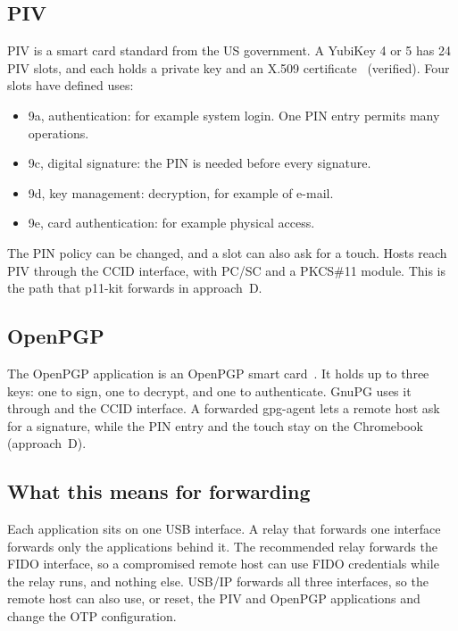 \subsection{PIV}

PIV is a smart card standard from the US government. A YubiKey 4 or 5 has 24
PIV slots, and each holds a private key and an X.509
certificate~\cite{yk-piv} (verified). Four slots have defined uses:
\begin{itemize}
\item 9a, authentication: for example system login. One PIN entry permits
      many operations.
\item 9c, digital signature: the PIN is needed before every signature.
\item 9d, key management: decryption, for example of e-mail.
\item 9e, card authentication: for example physical access.
\end{itemize}
The PIN policy can be changed, and a slot can also ask for a touch. Hosts
reach PIV through the CCID interface, with PC/SC and a PKCS\#11 module. This
is the path that p11-kit forwards in approach~D.

\subsection{OpenPGP}

The OpenPGP application is an OpenPGP smart card~\cite{yk-pgp}. It holds up
to three keys: one to sign, one to decrypt, and one to authenticate. GnuPG
uses it through  and the CCID interface. A forwarded
gpg-agent lets a remote host ask for a signature, while the PIN entry and the
touch stay on the Chromebook (approach~D).

\subsection{What this means for forwarding}

Each application sits on one USB interface. A relay that forwards one
interface forwards only the applications behind it. The recommended relay
forwards the FIDO interface, so a compromised remote host can use FIDO
credentials while the relay runs, and nothing else. USB/IP forwards all
three interfaces, so the remote host can also use, or reset, the PIV and
OpenPGP applications and change the OTP configuration.
